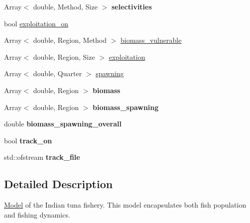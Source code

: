 \begin{DoxyCompactItemize}
\item 
\hypertarget{classIOSKJ_1_1Model_aa59ec2970e6ab5478b29d68ad89b67d9}{Array$<$ double, Method, Size $>$ {\bfseries selectivities}}\label{classIOSKJ_1_1Model_aa59ec2970e6ab5478b29d68ad89b67d9}

\item 
bool \hyperlink{classIOSKJ_1_1Model_ab9afc5bae0ac8e16817802e54bdfa60d}{exploitation\-\_\-on}
\item 
Array$<$ double, Region, Method $>$ \hyperlink{classIOSKJ_1_1Model_a0aa015def5316af0f5ce23bdaecbf67c}{biomass\-\_\-vulnerable}
\item 
Array$<$ double, Region, Size $>$ \hyperlink{classIOSKJ_1_1Model_ad4379e82be5723f2e1b58e9492dde3dc}{exploitation}
\item 
Array$<$ double, Quarter $>$ \hyperlink{classIOSKJ_1_1Model_a81bffc6707aa313f87bf21dbbf1d8143}{spawning}
\item 
\hypertarget{classIOSKJ_1_1Model_a05da71e81b1a0a7ecbba4d417f4ba727}{Array$<$ double, Region $>$ {\bfseries biomass}}\label{classIOSKJ_1_1Model_a05da71e81b1a0a7ecbba4d417f4ba727}

\item 
\hypertarget{classIOSKJ_1_1Model_ac507a33d868bbf1b74a6e098f32eb49f}{Array$<$ double, Region $>$ {\bfseries biomass\-\_\-spawning}}\label{classIOSKJ_1_1Model_ac507a33d868bbf1b74a6e098f32eb49f}

\item 
\hypertarget{classIOSKJ_1_1Model_a98d798c4e85e38a52c0b901ac19b82b1}{double {\bfseries biomass\-\_\-spawning\-\_\-overall}}\label{classIOSKJ_1_1Model_a98d798c4e85e38a52c0b901ac19b82b1}

\item 
\hypertarget{classIOSKJ_1_1Model_ab2c712a92a7f11ef0d8282bd97167872}{bool {\bfseries track\-\_\-on}}\label{classIOSKJ_1_1Model_ab2c712a92a7f11ef0d8282bd97167872}

\item 
\hypertarget{classIOSKJ_1_1Model_a54eea6573edc1058346964bd39413b99}{std\-::ofstream {\bfseries track\-\_\-file}}\label{classIOSKJ_1_1Model_a54eea6573edc1058346964bd39413b99}

\end{DoxyCompactItemize}


\subsection{Detailed Description}
\hyperlink{classIOSKJ_1_1Model}{Model} of the Indian tuna fishery. This model encapsulates both fish population and fishing dynamics.

